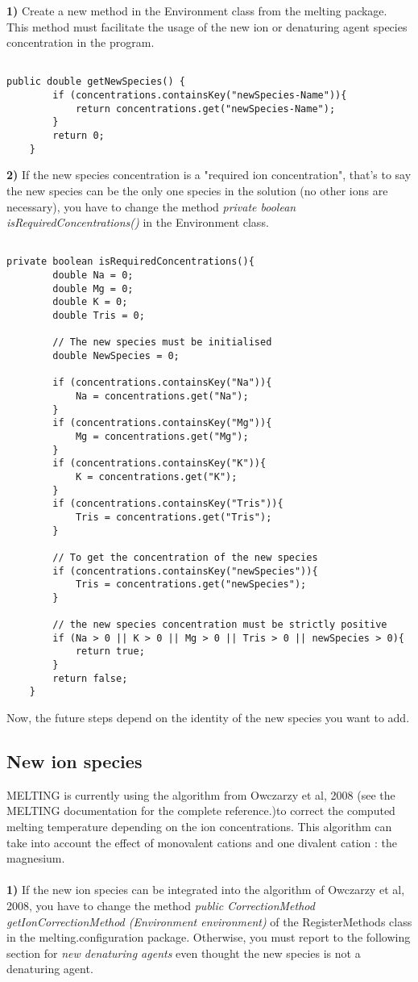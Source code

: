 \documentclass{article}
\begin{document}
\textbf{1)} Create a new method in the Environment class from the melting package. This method
must facilitate the usage of the new ion or denaturing agent species concentration in the
program.

\begin{verbatim}

public double getNewSpecies() {
		if (concentrations.containsKey("newSpecies-Name")){
			return concentrations.get("newSpecies-Name");
		}
		return 0;
	}

\end{verbatim}

\textbf{2)} If the new species concentration is a "required ion concentration", that's to say the new
species can be the only one species in the solution (no other ions are necessary), you have to 
change the method \textit{private boolean isRequiredConcentrations()} in the Environment class.

\begin{verbatim}

private boolean isRequiredConcentrations(){
		double Na = 0;
		double Mg = 0;
		double K = 0;
		double Tris = 0;
		
		// The new species must be initialised
		double NewSpecies = 0;
		
		if (concentrations.containsKey("Na")){
			Na = concentrations.get("Na");
		}
		if (concentrations.containsKey("Mg")){
			Mg = concentrations.get("Mg");
		}
		if (concentrations.containsKey("K")){
			K = concentrations.get("K");
		}
		if (concentrations.containsKey("Tris")){
			Tris = concentrations.get("Tris");
		}
		
		// To get the concentration of the new species
		if (concentrations.containsKey("newSpecies")){
			Tris = concentrations.get("newSpecies");
		}
		
		// the new species concentration must be strictly positive
		if (Na > 0 || K > 0 || Mg > 0 || Tris > 0 || newSpecies > 0){
			return true;
		}
		return false;
	}

\end{verbatim}

Now, the future steps depend on the identity of the new species you want to add.

\subsection{New ion species}

MELTING is currently using the algorithm from Owczarzy et al, 2008 (see the MELTING documentation
for the complete reference.)to correct the computed melting temperature depending on the ion 
concentrations. This algorithm can take into account the effect of monovalent cations and one divalent
cation : the magnesium.\\
\\
\textbf{1)} If the new ion species can be integrated into the algorithm of Owczarzy et al, 2008, you have to change
the method \textit{public CorrectionMethod getIonCorrectionMethod (Environment environment)} of the 
RegisterMethods class in the melting.configuration package. Otherwise, you must report to the following 
section for \textit{new denaturing agents} even thought the new species is not a denaturing agent.
\end{document}
